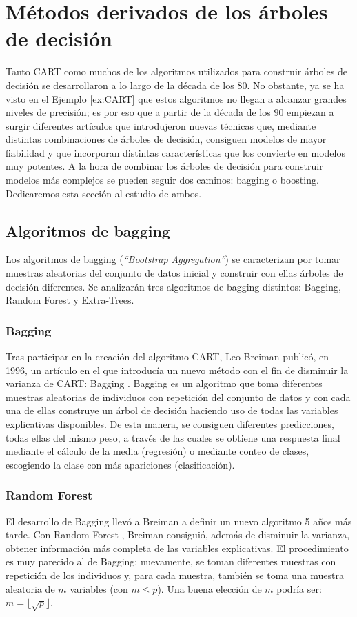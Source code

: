 \documentclass[12pt,twoside]{article}
\begin{document}
\section{Métodos derivados de los árboles de decisión}
Tanto CART como muchos de los algoritmos utilizados para construir árboles de decisión se desarrollaron a lo largo de la década de los 80. No obstante, ya se ha visto en el Ejemplo \ref{ex:CART} que estos algoritmos no llegan a alcanzar grandes niveles de precisión; es por eso que a partir de la década de los 90 empiezan a surgir diferentes artículos que introdujeron nuevas técnicas que, mediante distintas combinaciones de árboles de decisión, consiguen modelos de mayor fiabilidad y que incorporan distintas características que los convierte en modelos muy potentes. A la hora de combinar los árboles de decisión para construir modelos más complejos se pueden seguir dos caminos: bagging o boosting. Dedicaremos esta sección al estudio de ambos.


\subsection{Algoritmos de bagging}

Los algoritmos de bagging (\textit{``Bootstrap Aggregation''}) se caracterizan por tomar muestras aleatorias del conjunto de datos inicial y construir con ellas árboles de decisión diferentes. Se analizarán tres algoritmos de bagging distintos: Bagging, Random Forest y Extra-Trees.


\subsubsection{Bagging}
Tras participar en la creación del algoritmo CART, Leo Breiman publicó, en 1996, un artículo en el que introducía un nuevo método con el fin de disminuir la varianza de CART: Bagging \cite{BR01}. Bagging es un algoritmo que toma diferentes muestras aleatorias de individuos con repetición del conjunto de datos y con cada una de ellas construye un árbol de decisión haciendo uso de todas las variables explicativas disponibles. De esta manera, se consiguen diferentes predicciones, todas ellas del mismo peso, a través de las cuales se obtiene una respuesta final mediante el cálculo de la media (regresión) o mediante conteo de clases, escogiendo la clase con más apariciones (clasificación).


\subsubsection{Random Forest}
El desarrollo de Bagging llevó a Breiman a definir un nuevo algoritmo 5 años más tarde. Con Random Forest \cite{BR02}, Breiman consiguió, además de disminuir la varianza, obtener información más completa de las variables explicativas. El procedimiento es muy parecido al de Bagging: nuevamente, se toman diferentes muestras con repetición de los individuos y, para cada muestra, también se toma una muestra aleatoria de $m$ variables (con $m \leq p$). Una buena elección de $m$ podría ser: $ m = \lfloor \sqrt{p} \rfloor$.
\end{document}
